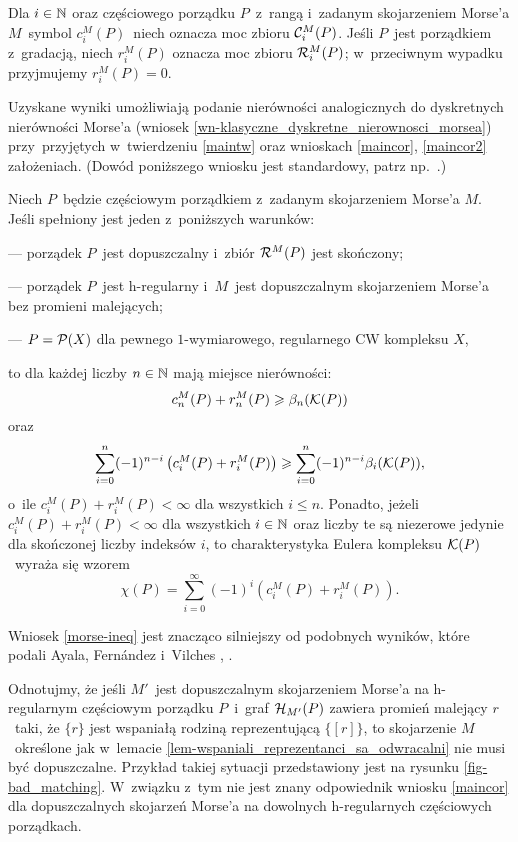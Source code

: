 Dla $i\in\mathbb{N}$ oraz częściowego porządku $P$~z~rangą i~zadanym skojarzeniem Morse'a $M$~symbol $c^M_i(P)$~niech oznacza moc zbioru $\mathcal{C}_i^M(P)$. Jeśli $P$~jest porządkiem z~gradacją, niech $r^M_i(P)$ oznacza moc zbioru $\mathcal{R}_i^M(P)$; w~przeciwnym wypadku przyjmujemy $r^M_i(P)=0$.

Uzyskane wyniki umożliwiają podanie nierówności analogicznych do dyskretnych nierówności Morse'a (wniosek \ref{wn-klasyczne_dyskretne_nierownosci_morsea}) przy~przyjętych w~twierdzeniu \ref{maintw} oraz wnioskach \ref{maincor}, \ref{maincor2} założeniach. (Dowód poniższego wniosku jest standardowy, patrz np.~\cite[str. 28-31]{Milnor63}.)

\begin{wn}\label{morse-ineq}
Niech $P$~będzie częściowym porządkiem z~zadanym skojarzeniem Morse'a $M$. Jeśli spełniony jest jeden z~poniższych warunków:
\begin{compactitem}
\item[---] porządek $P$~jest dopuszczalny i~zbiór $\mathcal{R}^M(P)$ jest skończony;
\item[---] porządek $P$~jest h-regularny i~$M$~jest dopuszczalnym skojarzeniem Morse'a bez promieni malejących;
\item[---] $P=\mathcal{P}(X)$ dla pewnego $1$-wymiarowego, regularnego CW kompleksu $X$,
\end{compactitem}
to dla każdej liczby $n\in\mathbb{N}$ mają miejsce nierówności:
\[c^M_n(P)+r^M_n(P)\geqslant \beta_n(\mathcal{K}(P))\]
oraz
\[\sum_{i=0}^{n}(-1)^{n-i}\left(c^M_i(P)+r^M_i(P)\right)\geqslant \sum_{i=0}^{n}(-1)^{n-i}\beta_i(\mathcal{K}(P)),\] o~ile $c^M_i(P)+r^M_i(P)<\infty$ dla wszystkich $i\leq n$. 
Ponadto, jeżeli $c^M_i(P)+r^M_i(P)<\infty$ dla wszystkich $i\in\mathbb{N}$ oraz liczby te są niezerowe jedynie dla skończonej liczby indeksów $i$, to charakterystyka Eulera kompleksu $\mathcal{K}(P)$~wyraża się wzorem \[\chi(P)=\sum_{i=0}^{\infty}(-1)^i \left(c^M_i(P)+r^M_i(P)\right).\]
\end{wn}
Wniosek \ref{morse-ineq} jest znacząco silniejszy od podobnych wyników, które podali Ayala, Fern{\'a}ndez i~Vilches \cite[Theorem 3.8]{Ayala07}, \cite[Theorem 3.1]{Ayala09}.

Odnotujmy, że jeśli $M'$~jest dopuszczalnym skojarzeniem Morse'a na \mbox{h-regularnym} częściowym porządku $P$~i~graf $\mathcal{H}_{M'}(P)$ zawiera promień malejący $r$~taki, że $\{r\}$ jest wspaniałą rodziną reprezentującą $\{[r]\}$, to skojarzenie $M$~określone jak w~lemacie \ref{lem-wspaniali_reprezentanci_sa_odwracalni} nie musi być dopuszczalne. Przykład takiej sytuacji przedstawiony jest na rysunku \ref{fig-bad_matching}. W~związku z~tym nie jest znany odpowiednik wniosku \ref{maincor} dla dopuszczalnych skojarzeń Morse'a na dowolnych \mbox{h-regularnych} częściowych porządkach.

